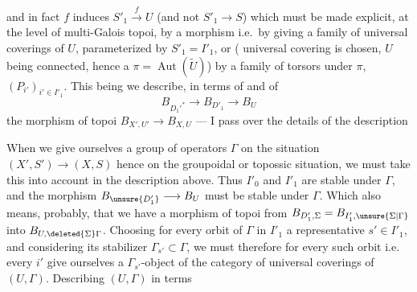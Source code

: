 and in fact $f$ induces $S'_1\xrightarrow{f}U$ (and not $S'_1\longrightarrow S$) which must be made explicit, at the level  of multi-Galois topoi, by a morphism
i.e.\ by giving a family of universal coverings of $U$, parameterized by $S'_1=I'_1$, or ( universal covering is chosen, $U$ being connected, hence a $\pi=\operatorname{Aut}(\widetilde U)$) by a family of torsors under  $\pi$, $(P_{i'})_{i'\in I'_1}$.
This being   we  describe, in terms of
and of
\[
B_{D_1'^*}\longrightarrow B_{D'_1}\longrightarrow B_U
\]
 the morphism of topoi $B_{X',U'}\longrightarrow B_{X,U}$
--- I pass over the details of the description


When we give ourselves a group of operators \deleted{$\Sigma$}$\Gamma$ on the situation $(X',S')\longrightarrow(X,S)$ hence on the groupoidal or topossic situation, we must take this into account in the description above.
Thus $I'_0$ and $I'_1$ are stable under $\Gamma$, and the morphism  $B_{\unsure{D'_1}}\longrightarrow B_U$ must be stable under $\Gamma$.
Which also means, probably, that we have a morphism of topoi from
$B_{D'_1,\Sigma}=B_{I'_1,\unsure{\Sigma|\Gamma}}$
into $B_{U,\deleted{\Sigma}\Gamma}$.
Choosing for every orbit of $\Gamma$ in $I'_1$ a representative $s'\in I'_1$, and considering its stabilizer $\Gamma_{s'}\subset\Gamma$, we must therefore for every such orbit i.e.\  every $i'$ give ourselves a $\Gamma_{s'}$-object of the category of universal coverings of $(U,\Gamma)$.
  Describing $(U,\Gamma)$ in terms

